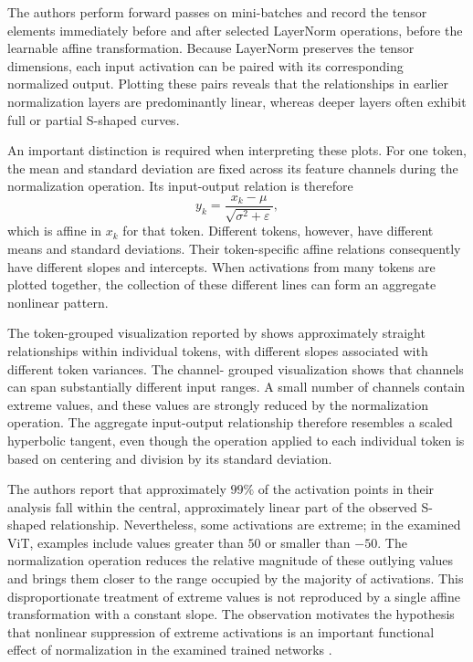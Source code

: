 The authors perform forward passes on mini-batches and record the tensor
elements immediately before and after selected LayerNorm operations,
before the learnable affine transformation. Because LayerNorm preserves
the tensor dimensions, each input activation can be paired with its
corresponding normalized output. Plotting these pairs reveals that the
relationships in earlier normalization layers are predominantly linear,
whereas deeper layers often exhibit full or partial S-shaped curves.

An important distinction is required when interpreting these plots. For
one token, the mean and standard deviation are fixed across its feature
channels during the normalization operation. Its input-output relation is
therefore
\begin{equation}
    y_k
    =
    \frac{x_k-\mu}{\sqrt{\sigma^2+\varepsilon}},
    \label{eq:norm-token-affine-map}
\end{equation}
which is affine in \(x_k\) for that token. Different tokens, however, have
different means and standard deviations. Their token-specific affine
relations consequently have different slopes and intercepts. When
activations from many tokens are plotted together, the collection of these
different lines can form an aggregate nonlinear pattern.

The token-grouped visualization reported by \textcite{zhu2025dyt} shows
approximately straight relationships within individual tokens, with
different slopes associated with different token variances. The channel-
grouped visualization shows that channels can span substantially different
input ranges. A small number of channels contain extreme values, and these
values are strongly reduced by the normalization operation. The aggregate
input-output relationship therefore resembles a scaled hyperbolic tangent,
even though the operation applied to each individual token is based on
centering and division by its standard deviation.

The authors report that approximately \(99\%\) of the activation points in
their analysis fall within the central, approximately linear part of the
observed S-shaped relationship. Nevertheless, some activations are
extreme; in the examined ViT, examples include values greater than \(50\)
or smaller than \(-50\). The normalization operation reduces the relative
magnitude of these outlying values and brings them closer to the range
occupied by the majority of activations. This disproportionate treatment
of extreme values is not reproduced by a single affine transformation with
a constant slope. The observation motivates the hypothesis that nonlinear
suppression of extreme activations is an important functional effect of
normalization in the examined trained networks
\parencite{zhu2025dyt}.

